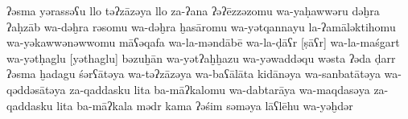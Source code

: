 \begin{transliteration}
    ʔəsma yərassəʕu llo təʔzāzəya
    llo za-ʔana ʔəʔēzzəzomu wa-yaḥawwəru dəḫra ʔaḥzāb wa-dəḫra
    rəsomu wa-dəḫra ḫasāromu wa-yətqan\-nayu la-ʔamāləktihomu
    wa-yəkawwənəwwomu māʕəqafa wa-la-məndābē wa-la-ḍāʕr [ṣāʕr] wa-la-maśgart
    wa-yətḥaglu [yəthaglu] bəzuḫān wa-yətʔaḫḫazu wa-yəwaddəqu wəsta
    ʔəda ḍarr ʔəsma ḫadagu śərʕātəya wa-təʔzāzəya wa-baʕālāta
    kidānǝya wa-sanbatātǝya wa-qəddǝsātǝya za-qaddasku lita ba-māʔkalomu
    wa-dabtarāya wa-maqdasǝya za-qaddasku lita ba-māʔkala
    mədr kama ʔəśim səməya lāʕlēhu wa-yəḫdər

\end{transliteration}

